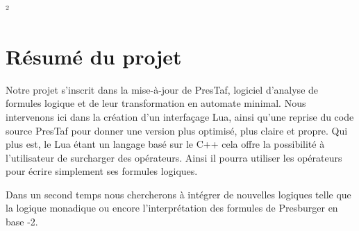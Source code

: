 ²\section{Résumé du projet}

Notre projet s'inscrit dans la mise-à-jour de PresTaf, logiciel d'analyse de formules logique et de leur transformation en automate minimal. Nous intervenons ici dans la création d'un interfaçage Lua, ainsi qu'une reprise du code source PresTaf pour donner une version plus optimisé, plus claire et propre. Qui plus est, le Lua étant un langage basé sur le C++ cela offre la possibilité à l'utilisateur de surcharger des opérateurs. Ainsi il pourra utiliser les opérateurs pour écrire simplement ses formules logiques.\\\par

Dans un second temps nous chercherons à intégrer de nouvelles logiques telle que la logique monadique ou encore l'interprétation des formules de Presburger en base -2.

